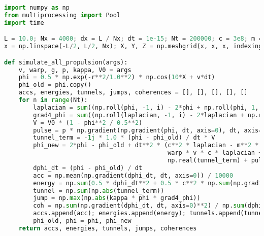 \documentclass[11pt]{article}
\begin{document}
\begin{lstlisting}[language=Python, caption={Fluxonic Gravitational Vehicle Simulation}, label={lst:fgv}]
import numpy as np
from multiprocessing import Pool
import time

L = 10.0; Nx = 4000; dx = L / Nx; dt = 1e-15; Nt = 200000; c = 3e8; m = 0.5; lam = 0.1; q = 0.1; k = 0.01; G = 6.674e-11
x = np.linspace(-L/2, L/2, Nx); X, Y, Z = np.meshgrid(x, x, x, indexing='ij'); r = np.sqrt(X**2 + Y**2 + Z**2)

def simulate_all_propulsion(args):
    v, warp, g, p, kappa, V0 = args
    phi = 0.5 * np.exp(-r**2/1.0**2) * np.cos(10*X + v*dt)
    phi_old = phi.copy()
    accs, energies, tunnels, jumps, coherences = [], [], [], [], []
    for n in range(Nt):
        laplacian = sum((np.roll(phi, -1, i) - 2*phi + np.roll(phi, 1, i)) / dx**2 for i in range(3))
        grad4_phi = sum((np.roll(laplacian, -1, i) - 2*laplacian + np.roll(laplacian, 1, i)) / dx**2 for i in range(3))
        V = V0 * (1 - phi**2 / 0.5**2)
        pulse = p * np.gradient(np.gradient(phi, dt, axis=0), dt, axis=0) * np.cos(0.01 * n * dt)
        tunnel_term = -1j * 1.0 * (phi - phi_old) / dt * V
        phi_new = 2*phi - phi_old + dt**2 * (c**2 * laplacian - m**2 * phi - g * phi**3 - lam * phi**5 + 
                                             warp * v * c * laplacian + kappa * phi * grad4_phi + 
                                             np.real(tunnel_term) + pulse - 8*np.pi*G*k*phi**2)
        dphi_dt = (phi - phi_old) / dt
        acc = np.mean(np.gradient(dphi_dt, dt, axis=0)) / 10000
        energy = np.sum(0.5 * dphi_dt**2 + 0.5 * c**2 * np.sum(np.gradient(phi, dx)**2, axis=0))
        tunnel = np.sum(np.abs(tunnel_term))
        jump = np.max(np.abs(kappa * phi * grad4_phi))
        coh = np.sum(np.gradient(dphi_dt, dt, axis=0)**2) / np.sum(dphi_dt**2) * dx**3
        accs.append(acc); energies.append(energy); tunnels.append(tunnel); jumps.append(jump); coherences.append(coh)
        phi_old, phi = phi, phi_new
    return accs, energies, tunnels, jumps, coherences


\end{lstlisting}
\end{document}

